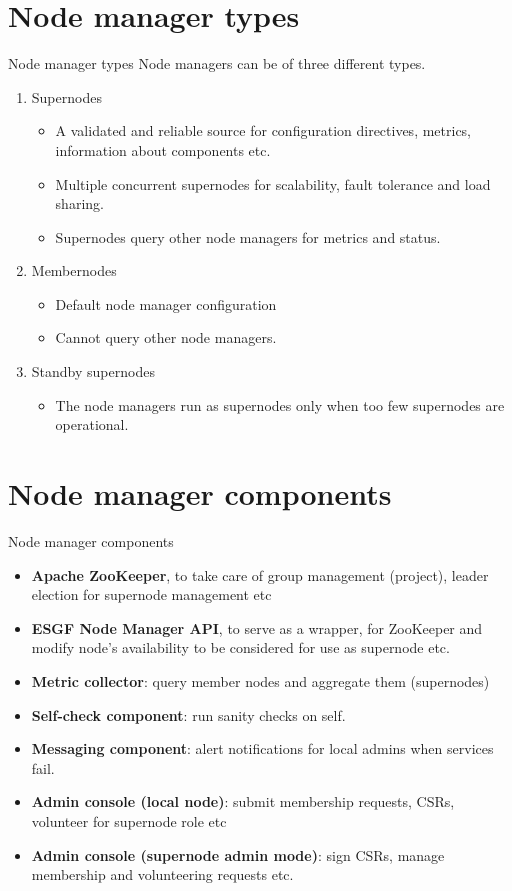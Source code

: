 \documentclass{beamer}
\begin{document}
\section{Node manager types}
\begin{frame}{Node manager types}
Node managers can be of three different types.
\begin{enumerate}
\item Supernodes
\begin{itemize}
\item A validated and reliable source for configuration directives, metrics, information about components etc.
\item Multiple concurrent supernodes for scalability, fault tolerance and load sharing.
\item Supernodes query other node managers for metrics and status.
\end{itemize}
\item Membernodes
\begin{itemize}
\item Default node manager configuration
\item Cannot query other node managers.
\end{itemize}
\item Standby supernodes
\begin{itemize}
\item The node managers run as supernodes only when too few supernodes are operational.
\end{itemize}
\end{enumerate}
\end{frame}

\section{Node manager components}
\begin{frame}{Node manager components}
\begin{itemize}
\item \textbf{Apache ZooKeeper}, to take care of group management (project), leader election for supernode management etc
\item \textbf{ESGF Node Manager API}, to serve as a wrapper, for ZooKeeper and modify node's availability to be considered for use as supernode etc.
\item \textbf{Metric collector}: query member nodes and aggregate them (supernodes)
\item \textbf{Self-check component}: run sanity checks on self.
\item \textbf{Messaging component}: alert notifications for local admins when services fail.
\item \textbf{Admin console (local node)}: submit membership requests, CSRs, volunteer for supernode role etc
\item \textbf{Admin console (supernode admin mode)}: sign CSRs, manage membership and volunteering requests etc. 
\end{itemize}
\end{frame}

\end{document}
